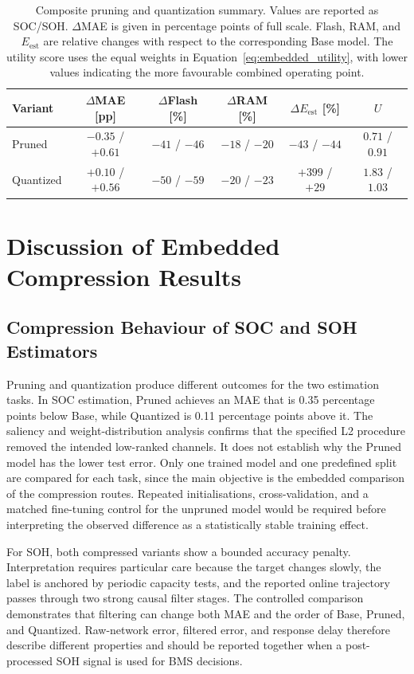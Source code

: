\documentclass[
    a4paper,
    12pt,
    titlepage,
    bibliography=totoc,
    twoside=on,
    parskip=false,
    numbers=noenddot,
    cleardoublepage=empty,
    DIV=12,
    BCOR=12.0mm,
    headheight=36pt,
    headings=openright
]{scrreprt}
\begin{document}
\begin{table}[H]
    \centering
    \caption[Pruning and quantization summary.]{Composite pruning and quantization summary. Values are reported as SOC/SOH. $\Delta$MAE is given in percentage points of full scale. Flash, RAM, and $E_{\mathrm{est}}$ are relative changes with respect to the corresponding Base model. The utility score uses the equal weights in Equation~\ref{eq:embedded_utility}, with lower values indicating the more favourable combined operating point.}
    \label{tab:embedded_tradeoff_summary}
    \begin{tabular}{@{}lccccc@{}}
        \toprule
        Variant & $\Delta$MAE [pp] & $\Delta$Flash [\%] & $\Delta$RAM [\%] & $\Delta E_{\mathrm{est}}$ [\%] & $U$ \\
        \midrule
        Pruned & $-0.35$ / $+0.61$ & $-41$ / $-46$ & $-18$ / $-20$ & $-43$ / $-44$ & $0.71$ / $0.91$ \\
        Quantized & $+0.10$ / $+0.56$ & $-50$ / $-59$ & $-20$ / $-23$ & $+399$ / $+29$ & $1.83$ / $1.03$ \\
        \bottomrule
    \end{tabular}
\end{table}

\section{Discussion of Embedded Compression Results}
\subsection{Compression Behaviour of SOC and SOH Estimators}
Pruning and quantization produce different outcomes for the two estimation tasks. In SOC estimation, Pruned achieves an MAE that is 0.35 percentage points below Base, while Quantized is 0.11 percentage points above it. The saliency and weight-distribution analysis confirms that the specified L2 procedure removed the intended low-ranked channels. It does not establish why the Pruned model has the lower test error. Only one trained model and one predefined split are compared for each task, since the main objective is the embedded comparison of the compression routes. Repeated initialisations, cross-validation, and a matched fine-tuning control for the unpruned model would be required before interpreting the observed difference as a statistically stable training effect.

For SOH, both compressed variants show a bounded accuracy penalty. Interpretation requires particular care because the target changes slowly, the label is anchored by periodic capacity tests, and the reported online trajectory passes through two strong causal filter stages. The controlled comparison demonstrates that filtering can change both MAE and the order of Base, Pruned, and Quantized. Raw-network error, filtered error, and response delay therefore describe different properties and should be reported together when a post-processed SOH signal is used for BMS decisions.
\end{document}
